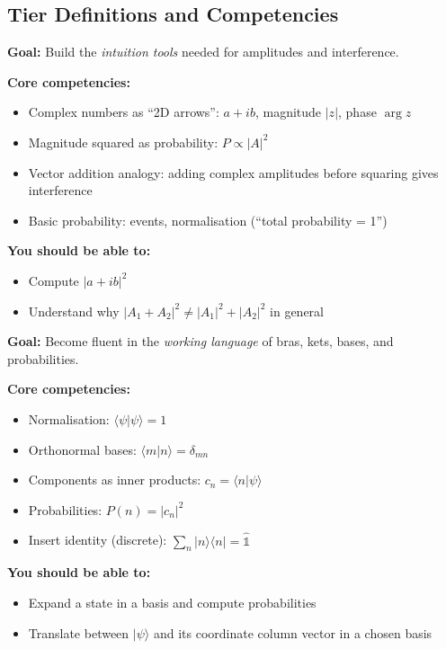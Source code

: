 \documentclass[11pt,a4paper]{article}
\begin{document}
\subsection{Tier Definitions and Competencies}

\begin{tcolorbox}[tierbox=tier1col, title={Tier 1 --- High School (HS)\ \ \normalfont\small[\textcolor{ugblue}{Undergraduate track}]}]
\textbf{Goal:} Build the \emph{intuition tools} needed for amplitudes and interference.

\medskip\noindent\textbf{Core competencies:}
\begin{itemize}[leftmargin=1.5em,itemsep=2pt]
  \item Complex numbers as ``2D arrows'': $a+ib$, magnitude $|z|$, phase $\arg z$
  \item Magnitude squared as probability: $P\propto|A|^2$
  \item Vector addition analogy: adding complex amplitudes before squaring gives interference
  \item Basic probability: events, normalisation (``total probability = 1'')
\end{itemize}

\medskip\noindent\textbf{You should be able to:}
\begin{itemize}[leftmargin=1.5em,itemsep=2pt]
  \item Compute $|a+ib|^2$
  \item Understand why $|A_1+A_2|^2\neq|A_1|^2+|A_2|^2$ in general
\end{itemize}
\end{tcolorbox}

\medskip
\begin{tcolorbox}[tierbox=tier2col, title={Tier 2 --- Beginning Undergraduate (BegUG)\ \ \normalfont\small[\textcolor{ugblue}{Undergraduate track}]}]
\textbf{Goal:} Become fluent in the \emph{working language} of bras, kets, bases,
and probabilities.

\medskip\noindent\textbf{Core competencies:}
\begin{itemize}[leftmargin=1.5em,itemsep=2pt]
  \item Normalisation: $\langle\psi|\psi\rangle=1$
  \item Orthonormal bases: $\langle m|n\rangle=\delta_{mn}$
  \item Components as inner products: $c_n=\langle n|\psi\rangle$
  \item Probabilities: $P(n)=|c_n|^2$
  \item Insert identity (discrete): $\displaystyle\sum_n|n\rangle\langle n|=\hat{\mathbb{1}}$
\end{itemize}

\medskip\noindent\textbf{You should be able to:}
\begin{itemize}[leftmargin=1.5em,itemsep=2pt]
  \item Expand a state in a basis and compute probabilities
  \item Translate between $|\psi\rangle$ and its coordinate column vector in a chosen basis
\end{itemize}
\end{tcolorbox}
\end{document}
